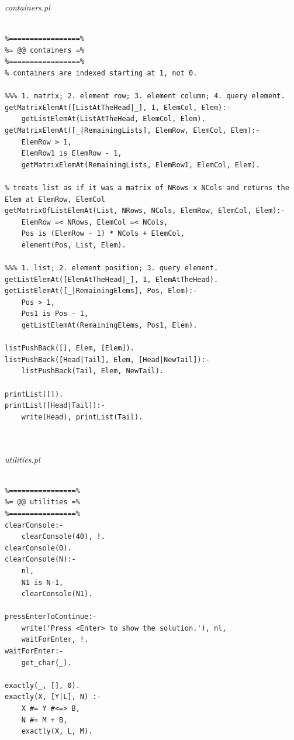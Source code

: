 \documentclass[runningheads,a4paper]{llncs}
\begin{document}
\noindent
{\it containers.pl}
\begin{changemargin}{-3cm}{-4cm}
\begin{verbatim}

%=================%
%= @@ containers =%
%=================%
% containers are indexed starting at 1, not 0.

%%% 1. matrix; 2. element row; 3. element column; 4. query element.
getMatrixElemAt([ListAtTheHead|_], 1, ElemCol, Elem):-
    getListElemAt(ListAtTheHead, ElemCol, Elem).
getMatrixElemAt([_|RemainingLists], ElemRow, ElemCol, Elem):-
    ElemRow > 1,
    ElemRow1 is ElemRow - 1,
    getMatrixElemAt(RemainingLists, ElemRow1, ElemCol, Elem).

% treats list as if it was a matrix of NRows x NCols and returns the Elem at ElemRow, ElemCol
getMatrixOfListElemAt(List, NRows, NCols, ElemRow, ElemCol, Elem):-
    ElemRow =< NRows, ElemCol =< NCols,
    Pos is (ElemRow - 1) * NCols + ElemCol,
    element(Pos, List, Elem).

%%% 1. list; 2. element position; 3. query element.
getListElemAt([ElemAtTheHead|_], 1, ElemAtTheHead).
getListElemAt([_|RemainingElems], Pos, Elem):-
    Pos > 1,
    Pos1 is Pos - 1,
    getListElemAt(RemainingElems, Pos1, Elem).

listPushBack([], Elem, [Elem]).
listPushBack([Head|Tail], Elem, [Head|NewTail]):-
    listPushBack(Tail, Elem, NewTail).

printList([]).
printList([Head|Tail]):-
    write(Head), printList(Tail).
    
    
\end{verbatim}
\end{changemargin}

\noindent
{\it utilities.pl}
\begin{changemargin}{-3cm}{-4cm}
\begin{verbatim}

%================%
%= @@ utilities =%
%================%
clearConsole:-
    clearConsole(40), !.
clearConsole(0).
clearConsole(N):-
    nl,
    N1 is N-1,
    clearConsole(N1).

pressEnterToContinue:-
    write('Press <Enter> to show the solution.'), nl,
    waitForEnter, !.
waitForEnter:-
    get_char(_).

exactly(_, [], 0).
exactly(X, [Y|L], N) :-
    X #= Y #<=> B,
    N #= M + B,
    exactly(X, L, M).
    
    
\end{verbatim}
\end{changemargin}
\end{document}
